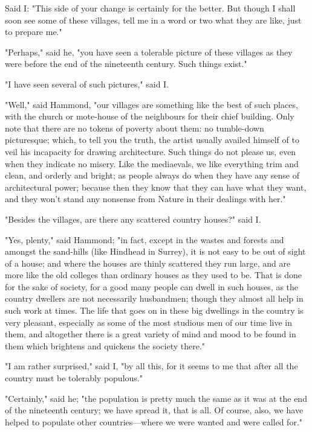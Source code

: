 Said I: "This side of your change is certainly for the better. But
though I shall soon see some of these villages, tell me in a word or two
what they are like, just to prepare me."

"Perhaps," said he, "you have seen a tolerable picture of these villages
as they were before the end of the nineteenth century. Such things
exist."

"I have seen several of such pictures," said I.

"Well," said Hammond, "our villages are something like the best of such
places, with the church or mote-house of the neighbours for their chief
building. Only note that there are no tokens of poverty about them: no
tumble-down picturesque; which, to tell you the truth, the artist
usually availed himself of to veil his incapacity for drawing
architecture. Such things do not please us, even when they indicate no
misery. Like the mediaevals, we like everything trim and clean, and
orderly and bright; as people always do when they have any sense of
architectural power; because then they know that they can have what they
want, and they won't stand any nonsense from Nature in their dealings
with her."

"Besides the villages, are there any scattered country houses?" said I.

"Yes, plenty," said Hammond; "in fact, except in the wastes and forests
and amongst the sand-hills (like Hindhead in Surrey), it is not easy to
be out of sight of a house; and where the houses are thinly scattered
they run large, and are more like the old colleges than ordinary houses
as they used to be. That is done for the sake of society, for a good
many people can dwell in such houses, as the country dwellers are not
necessarily husbandmen; though they almost all help in such work at
times. The life that goes on in these big dwellings in the country is
very pleasant, especially as some of the most studious men of our time
live in them, and altogether there is a great variety of mind and mood
to be found in them which brightens and quickens the society there."

"I am rather surprised," said I, "by all this, for it seems to me that
after all the country must be tolerably populous."

"Certainly," said he; "the population is pretty much the same as it was
at the end of the nineteenth century; we have spread it, that is all. Of
course, also, we have helped to populate other countries---where we were
wanted and were called for."

